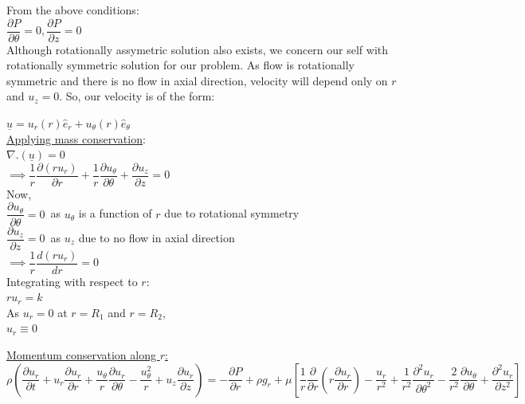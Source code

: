 \documentclass{article}
\begin{document}
\noindent From the above conditions: \\

$\dfrac{\partial P}{\partial \theta}=0, \dfrac{\partial P}{\partial z}=0$\\

\noindent Although rotationally assymetric solution also exists, we concern our self with rotationally symmetric solution for our problem. As flow is rotationally symmetric and there is no flow in axial direction, velocity will depend only on $r$ and $u_z=0$. So, our velocity is of the form: 

$\underline{u}=u_r(r)\hat{e}_r + u_\theta(r)\hat{e}_\theta$\\

\noindent \underline{Applying mass conservation}: \\ 
$\nabla.(\underline{u})=0$\\
$\implies \dfrac{1}{r} \dfrac{\partial (ru_r)}{\partial r} + \dfrac{1}{r} \dfrac{\partial u_\theta}{\partial \theta}+ \dfrac{\partial u_z}{\partial z}=0$ \\
Now, \\
$\dfrac{\partial u_\theta}{\partial \theta}=0$\ as $u_\theta$ is a function of $r$ due to rotational symmetry \\
$\dfrac{\partial u_z}{\partial z}=0$\ as $u_z$ due to no flow in axial direction\\
$\implies \dfrac{1}{r} \dfrac{d(ru_r)}{dr}=0$\\
Integrating with respect to $r$:\\
$ru_r=k$\\
As $u_r=0$ at $r=R_1$ and $r=R_2$,\\ $u_r \equiv 0$

\noindent \underline{Momentum conservation along $r$:}\\
$\rho (\dfrac{\partial u_r}{\partial t}+ u_r\dfrac{\partial u_r}{\partial r} + \dfrac{u_\theta}{r}\dfrac{\partial u_r}{\partial \theta} - \dfrac{u_\theta^2}{r}+ u_z\dfrac{\partial u_r}{\partial z}) = -\dfrac{\partial P}{\partial r}+ \rho g_r + \mu[\dfrac{1}{r}\dfrac{\partial}{\partial r}(r\dfrac{\partial u_r}{\partial r}) - \dfrac{u_r}{r^2} + \dfrac{1}{r^2}\dfrac{\partial^2 u_r}{\partial \theta^2} - \dfrac{2}{r^2}\dfrac{\partial u_\theta}{\partial \theta}+ \dfrac{\partial^2 u_r}{\partial z^2}]$\\
\end{document}
